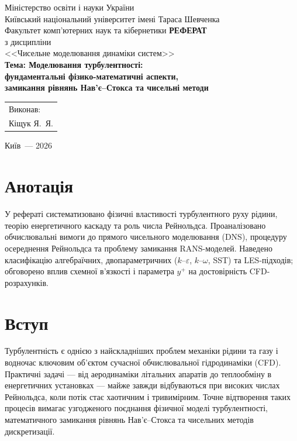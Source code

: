 \documentclass[14pt,a4paper,extarticle]{extarticle}
\begin{document}
\begin{titlepage}
  \centering\thispagestyle{empty}
  Міністерство освіти і науки України\\[0.4em]
  Київський національний університет імені Тараса Шевченка\\[0.4em]
  Факультет комп'ютерних наук та кібернетики
  \vfill
  {\Large\bfseries РЕФЕРАТ}\\[0.6em]
  з дисципліни\\[0.2em]
  <<Чисельне моделювання динаміки систем>>\\[1.2em]
  {\large\bfseries Тема: Моделювання турбулентності:\\
  фундаментальні фізико-математичні аспекти,\\
  замикання рівнянь Нав'є--Стокса та чисельні методи}
  \vfill
  \begin{flushright}
    \begin{tabular}{@{}l@{}}
      Виконав:\\
      Кіщук Я.~Я.\\[1.2em]
    \end{tabular}
  \end{flushright}
  \vfill
  Київ~--- 2026
\end{titlepage}

\section*{Анотація}

У рефераті систематизовано фізичні властивості турбулентного руху рідини,
теорію енергетичного каскаду та роль числа Рейнольдса. Проаналізовано
обчислювальні вимоги до прямого чисельного моделювання (DNS), процедуру
осереднення Рейнольдса та проблему замикання RANS-моделей. Наведено
класифікацію алгебраїчних, двопараметричних ($k$--$\varepsilon$,
$k$--$\omega$, SST) та LES-підходів; обговорено вплив схемної в'язкості
і параметра $y^+$ на достовірність CFD-розрахунків.

\tableofcontents
\newpage

\section{Вступ}

Турбулентність є однією з найскладніших проблем механіки рідини та газу
і водночас ключовим об'єктом сучасної обчислювальної гідродинаміки (CFD).
Практичні задачі --- від аеродинаміки літальних апаратів до теплообміну
в енергетичних установках --- майже завжди відбуваються при високих числах
Рейнольдса, коли потік стає хаотичним і тривимірним. Точне відтворення
таких процесів вимагає узгодженого поєднання фізичної моделі турбулентності,
математичного замикання рівнянь Нав'є--Стокса та чисельних методів
дискретизації.
\end{document}
